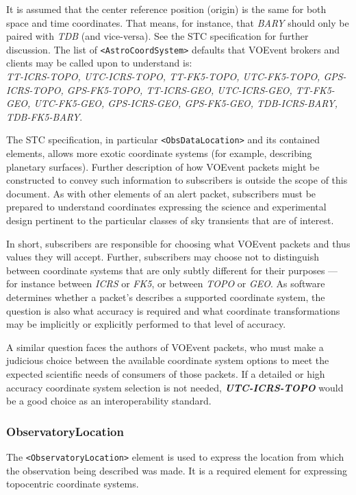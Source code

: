 \documentclass[11pt,a4paper]{ivoa}
\begin{document}
It is assumed that the center reference position (origin) is the same for both
space and time coordinates. That means, for instance, that \emph{BARY} should
only be paired with \emph{TDB} (and vice-versa). See the STC specification
\citep{2007ivoa.spec.1030R} %
for further discussion. The list of \verb|<AstroCoordSystem>| defaults that
VOEvent brokers and clients may be called upon to understand is: \\
\emph{TT-ICRS-TOPO, UTC-ICRS-TOPO, TT-FK5-TOPO, UTC-FK5-TOPO, GPS-ICRS-TOPO,
GPS-FK5-TOPO, TT-ICRS-GEO, UTC-ICRS-GEO, TT-FK5-GEO, UTC-FK5-GEO, GPS-ICRS-GEO,
GPS-FK5-GEO, TDB-ICRS-BARY, TDB-FK5-BARY}.

The STC specification, in particular \verb|<ObsDataLocation>| and its contained
elements, allows more exotic coordinate systems (for example, describing
planetary surfaces). Further description of how VOEvent packets might be
constructed to convey such information to subscribers is outside the scope of
this document. As with other elements of an alert packet, subscribers must be
prepared to understand coordinates expressing the science and experimental
design pertinent to the particular classes of sky transients that are of
interest.

In short, subscribers are responsible for choosing what VOEvent packets and thus
 values they will accept. Further, subscribers may choose
not to distinguish between coordinate systems that are only subtly different for
their purposes --- for instance between \emph{ICRS} or \emph{FK5}, or between
\emph{TOPO} or \emph{GEO}. As software determines whether a packet's
 describes a supported coordinate system, the question is also
what accuracy is required and what coordinate transformations may be implicitly
or explicitly performed to that level of accuracy.

A similar question faces the authors of VOEvent packets, who must make a
judicious choice between the available coordinate system options to meet the
expected scientific needs of consumers of those packets. If a detailed or high
accuracy coordinate system selection is not needed, \emph\textbf{UTC-ICRS-TOPO}
would be a good choice as an interoperability standard.

\subsubsection{ObservatoryLocation}
\label{sec:3.4.2}
The \verb|<ObservatoryLocation>| element is used to express the location from
which the observation being described was made. It is a required element for
expressing topocentric coordinate systems.
\end{document}
